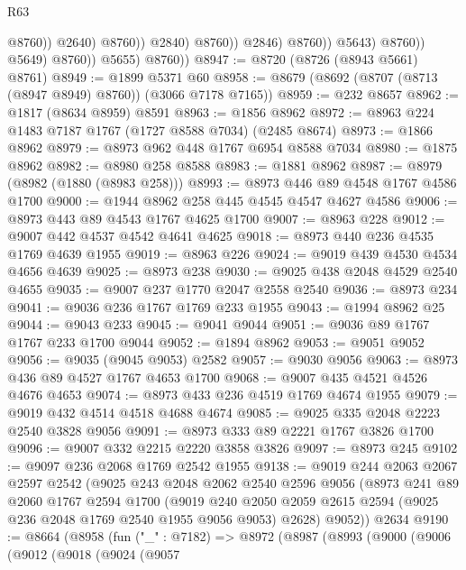 \begin{lexlean}{R63}
\begin{coremodule}
                                            @8760))
                                        @2640)
                                      @8760))
                                  @2840)
                                @8760))
                            @2846)
                          @8760))
                      @5643)
                    @8760))
                @5649)
              @8760))
          @5655)
        @8760))
@8947 := @8720 (@8726 (@8943 @5661) @8761)
@8949 := @1899 @5371 @60
@8958 := @8679 (@8692 (@8707 (@8713 (@8947 @8949) @8760)) (@3066 @7178 @7165))
@8959 := @232 @8657
@8962 := @1817 (@8634 @8959) @8591
@8963 := @1856 @8962
@8972 := @8963 @224 @1483 @7187 @1767 (@1727 @8588 @7034) (@2485 @8674)
@8973 := @1866 @8962
@8979 := @8973 @962 @448 @1767 @6954 @8588 @7034
@8980 := @1875 @8962
@8982 := @8980 @258 @8588
@8983 := @1881 @8962
@8987 := @8979 (@8982 (@1880 (@8983 @258)))
@8993 := @8973 @446 @89 @4548 @1767 @4586 @1700
@9000 := @1944 @8962 @258 @445 @4545 @4547 @4627 @4586
@9006 := @8973 @443 @89 @4543 @1767 @4625 @1700
@9007 := @8963 @228
@9012 := @9007 @442 @4537 @4542 @4641 @4625
@9018 := @8973 @440 @236 @4535 @1769 @4639 @1955
@9019 := @8963 @226
@9024 := @9019 @439 @4530 @4534 @4656 @4639
@9025 := @8973 @238
@9030 := @9025 @438 @2048 @4529 @2540 @4655
@9035 := @9007 @237 @1770 @2047 @2558 @2540
@9036 := @8973 @234
@9041 := @9036 @236 @1767 @1769 @233 @1955
@9043 := @1994 @8962 @25
@9044 := @9043 @233
@9045 := @9041 @9044
@9051 := @9036 @89 @1767 @1767 @233 @1700 @9044
@9052 := @1894 @8962
@9053 := @9051 @9052
@9056 := @9035 (@9045 @9053) @2582
@9057 := @9030 @9056
@9063 := @8973 @436 @89 @4527 @1767 @4653 @1700
@9068 := @9007 @435 @4521 @4526 @4676 @4653
@9074 := @8973 @433 @236 @4519 @1769 @4674 @1955
@9079 := @9019 @432 @4514 @4518 @4688 @4674
@9085 := @9025 @335 @2048 @2223 @2540 @3828 @9056
@9091 := @8973 @333 @89 @2221 @1767 @3826 @1700
@9096 := @9007 @332 @2215 @2220 @3858 @3826
@9097 := @8973 @245
@9102 := @9097 @236 @2068 @1769 @2542 @1955
@9138 := @9019
    @244
    @2063
    @2067
    @2597
    @2542
    (@9025
      @243
      @2048
      @2062
      @2540
      @2596
      @9056
      (@8973
        @241
        @89
        @2060
        @1767
        @2594
        @1700
        (@9019 @240 @2050 @2059 @2615 @2594 (@9025 @236 @2048 @1769 @2540 @1955 @9056 @9053) @2628)
        @9052))
    @2634
@9190 := @8664
    (@8958
      (fun ("_" : @7182) =>
      @8972
        (@8987
          (@8993
            (@9000
              (@9006
                (@9012
                  (@9018
                    (@9024
                      (@9057

\end{coremodule}
\end{lexlean}
